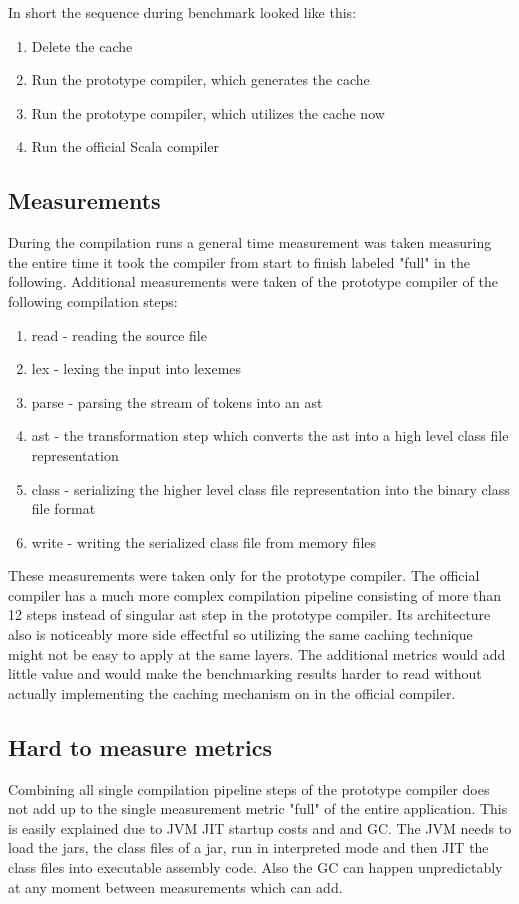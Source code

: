 \documentclass{VUMIFPSbakalaurinis}
\begin{document}
In short the sequence during benchmark looked like this:

\begin{enumerate}
\item{Delete the cache}
\item{Run the prototype compiler, which generates the cache}
\item{Run the prototype compiler, which utilizes the cache now}
\item{Run the official Scala compiler}
\end{enumerate}

\subsection{Measurements}

During the compilation runs a general time measurement was taken measuring the entire time it took the compiler from start to finish labeled "full" in the following.
Additional measurements were taken of the prototype compiler of the following compilation steps:

\begin{enumerate}
\item{read - reading the source file}
\item{lex - lexing the input into lexemes}
\item{parse - parsing the stream of tokens into an ast}
\item{ast - the transformation step which converts the ast into a high level class file representation}
\item{class - serializing the higher level class file representation into the binary class file format}
\item{write - writing the serialized class file from memory files}
\end{enumerate}

These measurements were taken only for the prototype compiler.
The official compiler has a much more complex compilation pipeline consisting of more than 12 steps instead of singular ast step in the prototype compiler.
Its architecture also is noticeably more side effectful so utilizing the same caching technique might not be easy to apply at the same layers.
The additional metrics would add little value and would make the benchmarking results harder to read without actually implementing the caching mechanism on in the official compiler.

\subsection{Hard to measure metrics}
Combining all single compilation pipeline steps of the prototype compiler does not add up to the single measurement metric "full" of the entire application.
This is easily explained due to JVM JIT startup costs and and GC.
The JVM needs to load the jars, the class files of a jar, run in interpreted mode and then JIT the class files into executable assembly code.
Also the GC can happen unpredictably at any moment between measurements which can add.
\end{document}
